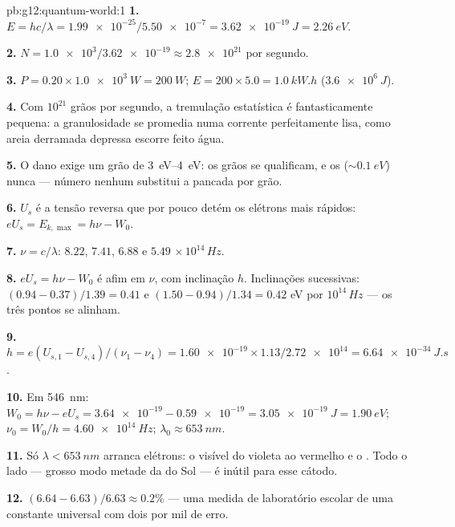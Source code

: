 \begin{solution}{pb:g12:quantum-world:1}
\textbf{1.} $E = hc/\lambda = \num{1.99e-25}/\num{5.50e-7} =
\qty{3.62e-19}{J} = \qty{2.26}{eV}$.

\textbf{2.} $N = \num{1.0e3}/\num{3.62e-19} \approx \num{2.8e21}$ 
por segundo.

\textbf{3.} $P = 0.20 \times \qty{1.0e3}{W} = \qty{200}{W}$;
$E = 200 \times 5.0 = \qty{1.0}{kW.h}$ ($\qty{3.6e6}{J}$).

\textbf{4.} Com $10^{21}$ grãos por segundo, a tremulação estatística é
fantasticamente pequena: a granulosidade se promedia numa corrente
perfeitamente lisa, como areia derramada depressa escorre feito água.

\textbf{5.} O dano exige um grão de \qtyrange{3}{4}{eV}: os grãos
 se qualificam, e os 
($\sim \qty{0.1}{eV}$) nunca --- número nenhum substitui a pancada por
grão.

\textbf{6.} $U_s$ é a tensão reversa que por pouco detém os elétrons mais
rápidos: $eU_s = E_{k,\max} = h\nu - W_0$.

\textbf{7.} $\nu = c/\lambda$: $8.22$, $7.41$, $6.88$ e $5.49$
$\times\,10^{14}\,\unit{Hz}$.

\textbf{8.} $eU_s = h\nu - W_0$ é afim em $\nu$, com inclinação $h$.
Inclinações sucessivas: $(0.94 - 0.37)/1.39 = 0.41$ e
$(1.50 - 0.94)/1.34 = 0.42$ \unit{eV} por $10^{14}\,\unit{Hz}$ --- os
três pontos se alinham.

\textbf{9.} $h = e(U_{s,1}-U_{s,4})/(\nu_1-\nu_4) = \num{1.60e-19}
\times 1.13/\num{2.72e14} = \qty{6.64e-34}{J.s}$.

\textbf{10.} Em \qty{546}{nm}:
$W_0 = h\nu - eU_s = \num{3.64e-19} - \num{0.59e-19} =
\qty{3.05e-19}{J} = \qty{1.90}{eV}$; $\nu_0 = W_0/h = \qty{4.60e14}{Hz}$;
$\lambda_0 \approx \qty{653}{nm}$.

\textbf{11.} Só $\lambda < \qty{653}{nm}$ arranca elétrons: o visível do
violeta ao vermelho e o . Todo o lado  ---
grosso modo metade da  do Sol --- é inútil para esse cátodo.

\textbf{12.} $(6.64 - 6.63)/6.63 \approx 0.2\%$ --- uma medida de
laboratório escolar de uma constante universal com dois por mil de erro.


\end{solution}
